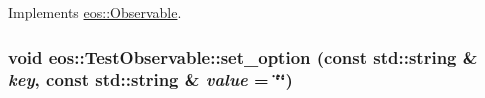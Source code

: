 Implements \hyperlink{classeos_1_1Observable_a233852d22f287944b8bbf4da803289b1}{eos::Observable}.\hypertarget{structeos_1_1TestObservable_ae4be408b4c96b6d86a080c966170b96b}{
\subsubsection[{set\_\-option}]{\setlength{\rightskip}{0pt plus 5cm}void eos::TestObservable::set\_\-option (const std::string \& {\em key}, \/  const std::string \& {\em value} = {\ttfamily \char`\"{}\char`\"{}})}}
\label{structeos_1_1TestObservable_ae4be408b4c96b6d86a080c966170b96b}


